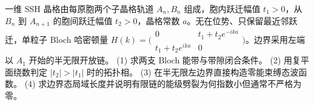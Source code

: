 一维 SSH 晶格由每原胞两个子晶格轨道 \(A_n,B_n\) 组成，胞内跃迁幅值 \(t_1>0\)，从 \(B_n\) 到 \(A_{n+1}\) 的胞间跃迁幅值 \(t_2>0\)，晶格常数 \(a\)。无在位势、只保留最近邻跃迁，单粒子 Bloch 哈密顿量 \(H(k)=\bigl(\begin{smallmatrix}0&t_1+t_2e^{-ika}\\t_1+t_2e^{ika}&0\end{smallmatrix}\bigr)\)。边界采用左端以 \(A_1\) 开始的半无限开放链。
(1) 求两支 Bloch 能带与带隙闭合条件。
(2) 用复平面绕数判定 \(|t_2|>|t_1|\) 时的拓扑相。
(3) 在半无限左边界直接构造零能束缚态波函数。
(4) 求边界态局域长度并说明有限链的能级劈裂为何指数小但通常不严格为零。
